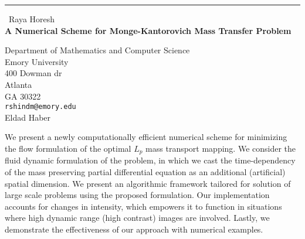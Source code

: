 \documentclass{report}
\begin{document}
\begin{center}
\rule{6in}{1pt} \
{\large Raya Horesh \\
{\bf A Numerical Scheme for Monge-Kantorovich Mass Transfer Problem}}

Department of Mathematics and Computer Science \\ Emory University \\ 400 Dowman dr \\ Atlanta \\ GA 30322
\\
{\tt rshindm@emory.edu}\\
Eldad Haber\end{center}

We present a newly computationally efficient numerical scheme for
minimizing the flow formulation of the optimal $L_p$ mass transport
mapping. We consider the fluid dynamic formulation of the problem, in
which we cast the time-dependency of the mass preserving partial
differential equation as an additional (artificial) spatial dimension. We
present an algorithmic framework tailored for solution of large scale
problems using the proposed formulation. Our implementation accounts for
changes in intensity, which empowers it to function in situations where
high dynamic range (high contrast) images are involved. Lastly, we
demonstrate the effectiveness of our approach with numerical examples.
\end{document}
